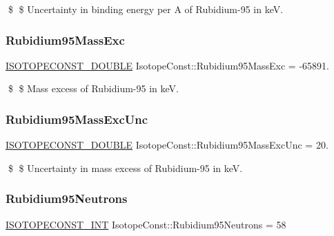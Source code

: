 \$ \$ Uncertainty in binding energy per A of Rubidium-\/95 in keV. \mbox{\label{group___isotope_const-_rubidium-_rb95_ga83ce41cdf1b41aaecad617a9510f7fea}} 
\subsubsection{\texorpdfstring{Rubidium95\+Mass\+Exc}{Rubidium95MassExc}}
{\footnotesize\ttfamily \mbox{\hyperlink{group___isotope_const-_macros_ga8f45a7272ce02c0b4c65c44636ed719a}{I\+S\+O\+T\+O\+P\+E\+C\+O\+N\+S\+T\+\_\+\+D\+O\+U\+B\+LE}} Isotope\+Const\+::\+Rubidium95\+Mass\+Exc = -\/65891.}

\$ \$ Mass excess of Rubidium-\/95 in keV. \mbox{\label{group___isotope_const-_rubidium-_rb95_ga01c10be9b610effecc6bc4a87b91ab02}} 
\subsubsection{\texorpdfstring{Rubidium95\+Mass\+Exc\+Unc}{Rubidium95MassExcUnc}}
{\footnotesize\ttfamily \mbox{\hyperlink{group___isotope_const-_macros_ga8f45a7272ce02c0b4c65c44636ed719a}{I\+S\+O\+T\+O\+P\+E\+C\+O\+N\+S\+T\+\_\+\+D\+O\+U\+B\+LE}} Isotope\+Const\+::\+Rubidium95\+Mass\+Exc\+Unc = 20.}

\$ \$ Uncertainty in mass excess of Rubidium-\/95 in keV. \mbox{\label{group___isotope_const-_rubidium-_rb95_gaf55ac3f32ed850603f370bcfdb8cc571}} 
\subsubsection{\texorpdfstring{Rubidium95\+Neutrons}{Rubidium95Neutrons}}
{\footnotesize\ttfamily \mbox{\hyperlink{group___isotope_const-_macros_ga5f18360b3e99483a35c32d789e62621c}{I\+S\+O\+T\+O\+P\+E\+C\+O\+N\+S\+T\+\_\+\+I\+NT}} Isotope\+Const\+::\+Rubidium95\+Neutrons = 58}

